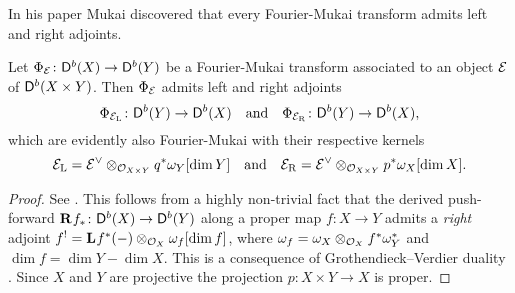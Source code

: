 In his paper \cite{Mukai1981} Mukai discovered that every Fourier-Mukai transform admits left and right adjoints. 

\begin{proposition}[Mukai]
    \label{Adjoints of FM transforms}
    Let $\Phi_{\mathcal E} \colon \mathsf{D}^b(X) \to \mathsf{D}^b(Y)$ be a Fourier-Mukai transform associated to an object $\mathcal E$ of $\mathsf{D}^b(X \times Y)$. Then $\Phi_{\mathcal E}$ admits left and right adjoints
    \[
        \Phi_{\mathcal E_\mathrm{L}} \colon \mathsf{D}^b(Y) \to \mathsf{D}^b(X) \quad \text{and} \quad \Phi_{\mathcal E_\mathrm{R}} \colon \mathsf{D}^b(Y) \to \mathsf{D}^b(X),
    \]
    which are evidently also Fourier-Mukai with their respective kernels
    \[
        \mathcal E_\mathrm{L} = \mathcal E^\vee \otimes_{{\mathcal{O}_{X \times Y}}} q^*\omega_Y[\dim Y] \quad \text{and} \quad 
        \mathcal E_\mathrm{R} = \mathcal E^\vee \otimes_{{\mathcal{O}_{X \times Y}}} p^*\omega_X[\dim X].
    \]
\end{proposition}

\begin{proof}
    See \cite[\S 5, Proposition 5.9]{huybrechts2006fouriermukai}. This follows from a highly non-trivial fact that the derived push-forward $\mathbf{R}^{}f_* \colon \mathsf{D}^b(X) \to \mathsf{D}^b(Y)$ along a proper map $f \colon X \to Y$ admits a \emph{right} adjoint $f^! = \mathbf{L}^{}f^*(-) \otimes_{\mathcal{O}_{X}} \omega_f[\dim f]$, where $\omega_f = \omega_X \otimes_{\mathcal{O}_{X}} f^*\omega_Y^*$ and $\dim f = \dim Y - \dim X$. This is a consequence of Grothendieck--Verdier duality \cite[\S VII, Corollary 4.3]{Hartshorne1966}. Since $X$ and $Y$ are projective the projection $p \colon X \times Y \to X$ is proper.
\end{proof}

